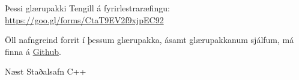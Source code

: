 \documentclass[handout]{beamer}
\begin{document}
\begin{frame}{Þessi glærupakki}
Tengill á fyrirlestraræfingu: \url{https://goo.gl/forms/CtaT9EV2f9xjpEC92}
\vspace{1cm}

Öll nafngreind forrit í þessum glærupakka, ásamt glærupakkanum sjálfum, má finna á  \href{https://github.com/Ernir/kennsluefni/tree/master/T2/Code/w2}{Github}.
\end{frame}


\begin{frame}{Næst}
Staðalsafn C++
\end{frame}
\end{document}
